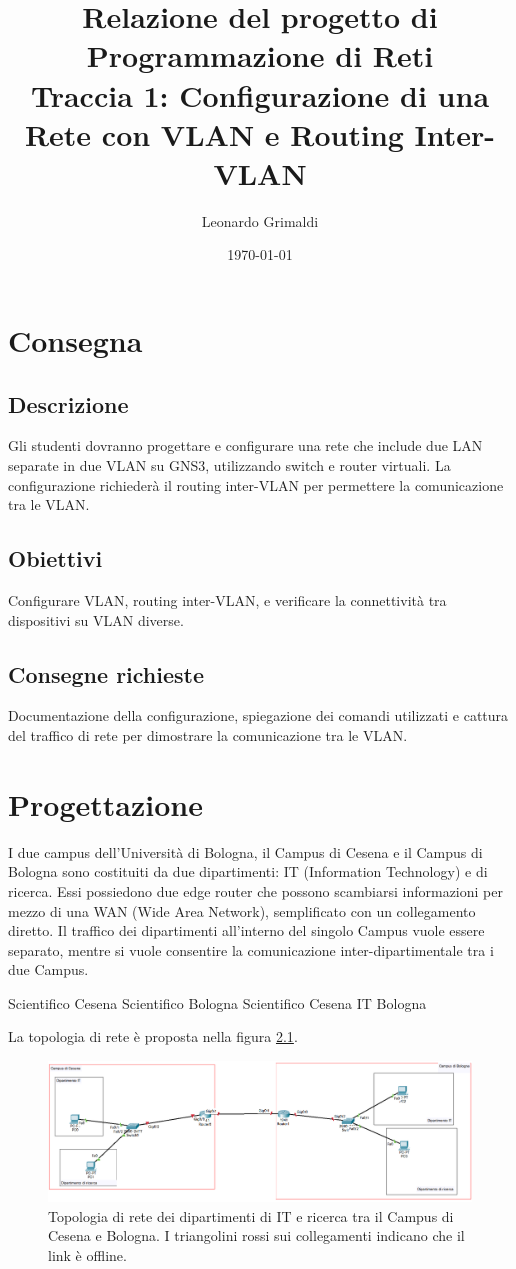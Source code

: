 \documentclass[a4paper,12pt]{report}
\title{Relazione del progetto di Programmazione di Reti 
    \\ Traccia 1: Configurazione di una Rete con VLAN e Routing Inter-VLAN}
\author{Leonardo Grimaldi}
\date{\today}
\newcommand{\myexample}[2]{
    \begin{tcolorbox}[colback=black!5!white,colframe=black,title={Esempio: #1}]
        #2
    \end{tcolorbox}
}
\begin{document}
\maketitle
\tableofcontents
\chapter{Consegna}
\section{Descrizione}
Gli studenti dovranno progettare e configurare una rete che include due LAN separate in due VLAN su GNS3, utilizzando switch e router virtuali. La configurazione richiederà il routing inter-VLAN per permettere la comunicazione tra le VLAN.
\section{Obiettivi}
Configurare VLAN, routing inter-VLAN, e verificare la connettività tra dispositivi su VLAN diverse.
\section{Consegne richieste}
Documentazione della configurazione, spiegazione dei comandi utilizzati e cattura del traffico di rete per dimostrare la comunicazione tra le VLAN.
\chapter{Progettazione}
I due campus dell'Università di Bologna, il Campus di Cesena e il Campus di Bologna sono costituiti da due dipartimenti: IT (Information Technology) e di ricerca.
%
Essi possiedono due edge router che possono scambiarsi informazioni per mezzo di una WAN (Wide Area Network), semplificato con un collegamento diretto.
%
Il traffico dei dipartimenti all'interno del singolo Campus vuole essere separato, mentre si vuole consentire la comunicazione inter-dipartimentale tra i due Campus.
%
\myexample{Ping tra i Campus}{
    Scientifico Cesena Scientifico Bologna
    Scientifico Cesena  IT Bologna
}
La topologia di rete è proposta nella figura \ref{fig:topologia_offline}. 
\begin{figure}
\includegraphics[width=\textwidth]{offline_topology_with_departments.png}
\caption{
    Topologia di rete dei dipartimenti di IT e ricerca tra il Campus di Cesena e Bologna.
    I triangolini rossi sui collegamenti indicano che il link è offline.
    }
\label{fig:topologia_offline}
\end{figure}
\end{document}
